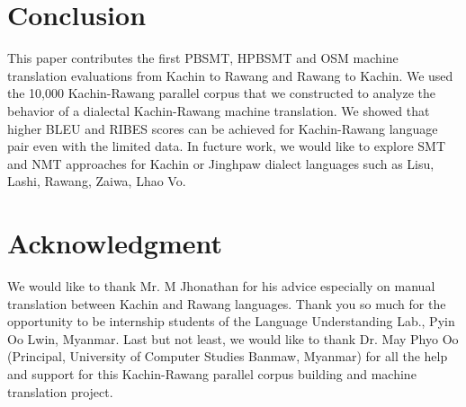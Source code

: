 \documentclass[conference]{IEEEtran}
\newcommand{\quotes}[1]{``#1''}
\begin{document}
     

\section{Conclusion}
\label{sec:conclusion}

This paper contributes the first PBSMT, HPBSMT and OSM machine translation evaluations from Kachin to Rawang and Rawang to Kachin. We used the 10,000 Kachin-Rawang parallel corpus that we constructed to analyze the behavior of a dialectal Kachin-Rawang machine translation. We showed that higher BLEU and RIBES scores can be achieved for Kachin-Rawang language pair even with the limited data. In fucture work, we would like to explore SMT and NMT approaches for Kachin or Jinghpaw dialect languages such as Lisu, Lashi, Rawang, Zaiwa, Lhao Vo.  

\section*{Acknowledgment}

We would like to thank Mr. M Jhonathan for his advice especially on manual translation between Kachin and Rawang languages. Thank you so much for the opportunity to be internship students of the Language Understanding Lab., Pyin Oo Lwin, Myanmar. Last but not least, we would like to thank Dr. May Phyo Oo (Principal, University of Computer Studies Banmaw, Myanmar) for all the help and support for this Kachin-Rawang parallel corpus building and machine translation project. 
\end{document}
